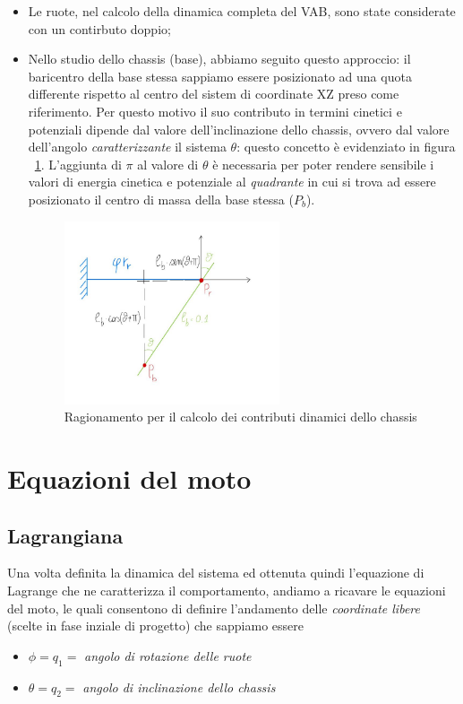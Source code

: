 \begin{itemize}
 	\item Le ruote, nel calcolo della dinamica completa del VAB, sono state considerate con un contirbuto doppio;
 	
 	\item Nello studio dello chassis (base), abbiamo seguito questo approccio: il baricentro della base stessa sappiamo essere posizionato ad una quota differente rispetto al centro del sistem di coordinate XZ preso come riferimento.
 	Per questo motivo il suo contributo in termini cinetici e potenziali dipende dal valore dell'inclinazione dello chassis, ovvero dal valore dell'angolo \textit{caratterizzante} il sistema $\theta$: questo concetto è evidenziato in figura ~\ref{fig:chassis}.
 	L'aggiunta di \textit{$\pi$} al valore di $\theta$ è necessaria per poter rendere sensibile i valori di energia cinetica e potenziale al \textit{quadrante} in cui si trova ad essere posizionato il centro di massa della base stessa ($P_b$).
 	
 	\begin{figure}[h]
 		\centering   	
 		\includegraphics[width=0.6\textwidth]{Immagini/ChassisAngle.jpg}
 		\caption{Ragionamento per il calcolo dei contributi dinamici dello chassis}
 		\label{fig:chassis}
 	\end{figure}
\end{itemize}

\newpage
\section{Equazioni del moto}
\subsection{Lagrangiana}
Una volta definita la dinamica del sistema ed ottenuta quindi l'equazione di Lagrange che ne caratterizza il comportamento, andiamo a ricavare le equazioni del moto, le quali consentono di definire l'andamento delle \textit{coordinate libere} (scelte in fase inziale di progetto) che sappiamo essere
\begin{itemize}
	\item $\phi = q_1 =$ \textit{angolo di rotazione delle ruote}
	\item $\theta = q_2 =$ \textit{angolo di inclinazione dello chassis}
\end{itemize}

